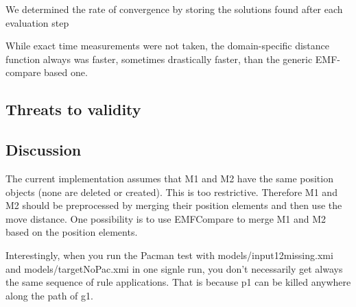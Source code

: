 We determined the rate of convergence by storing the solutions found after each evaluation step





While exact time measurements were not taken, the domain-specific distance function always was faster, sometimes drastically faster,
than the generic EMF-compare based one. 


\subsection{Threats to validity}

\subsection{Discussion}
The current implementation assumes that M1 and M2 have the same position objects (none are deleted or created). This is too restrictive. Therefore M1 and M2 should be preprocessed by merging their position elements and then use the move distance. One possibility is to use EMFCompare to merge M1 and M2 based on the position elements.

Interestingly, when you run the Pacman test with models/input12missing.xmi and models/targetNoPac.xmi in one signle run, you don't necessarily get always the same sequence of rule applications. That is because p1 can be killed anywhere along the path of g1. 